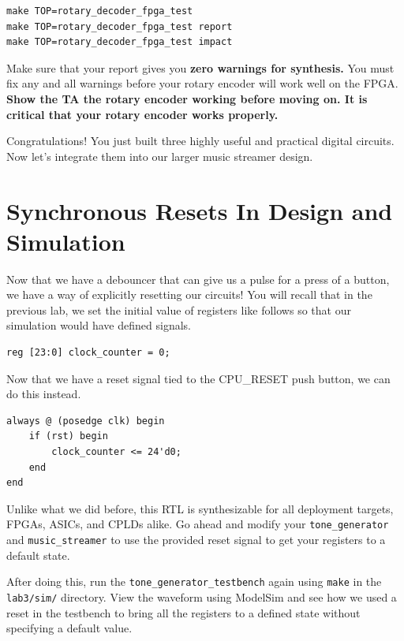 \documentclass[11pt]{article}
\begin{document}
\begin{verbatim}
make TOP=rotary_decoder_fpga_test
make TOP=rotary_decoder_fpga_test report
make TOP=rotary_decoder_fpga_test impact
\end{verbatim} 

Make sure that your report gives you \textbf{zero warnings for synthesis.} You must fix any and all warnings before your rotary encoder will work well on the FPGA.\\

\textbf{Show the TA the rotary encoder working before moving on. It is critical that your rotary encoder works properly.}

Congratulations! You just built three highly useful and practical digital circuits. Now let's integrate them into our larger music streamer design.

\section{Synchronous Resets In Design and Simulation}
Now that we have a debouncer that can give us a pulse for a press of a button, we have a way of explicitly resetting our circuits! You will recall that in the previous lab, we set the initial value of registers like follows so that our simulation would have defined signals.

\begin{verbatim}
reg [23:0] clock_counter = 0;
\end{verbatim}

Now that we have a reset signal tied to the CPU\_RESET push button, we can do this instead.

\begin{verbatim}
always @ (posedge clk) begin
	if (rst) begin
		clock_counter <= 24'd0;
	end
end
\end{verbatim}

Unlike what we did before, this RTL is synthesizable for all deployment targets, FPGAs, ASICs, and CPLDs alike. Go ahead and modify your \verb|tone_generator| and \verb|music_streamer| to use the provided reset signal to get your registers to a default state.

After doing this, run the \verb|tone_generator_testbench| again using \verb|make| in the \verb|lab3/sim/| directory. View the waveform using ModelSim and see how we used a reset in the testbench to bring all the registers to a defined state without specifying a default value.\\
\end{document}
